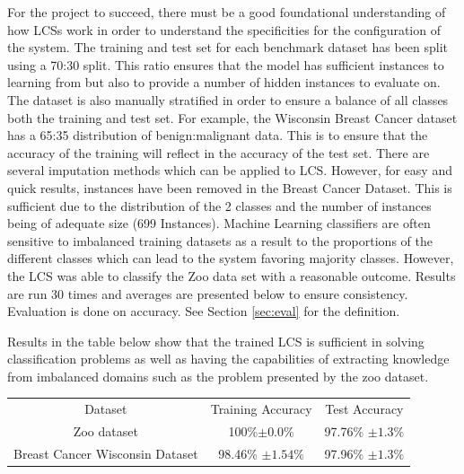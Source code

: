For the project to succeed, there must be a good foundational understanding of how LCSs work in order to understand the specificities for the configuration of the system. The training and test set for each benchmark dataset has been split using a 70:30 split. This ratio ensures that the model has sufficient instances to learning from but also to provide a number of hidden instances to evaluate on. The dataset is also manually stratified in order to ensure a balance of all classes both the training and test set. For example, the Wisconsin Breast Cancer dataset has a 65:35 distribution of benign:malignant data. This is to ensure that the accuracy of the training will reflect in the accuracy of the test set. There are several imputation methods which can be applied to LCS. However, for easy and quick results, instances have been removed in the Breast Cancer Dataset. This is sufficient due to the distribution of the 2 classes and the number of instances being of adequate size (699 Instances).  Machine Learning classifiers are often sensitive to imbalanced training datasets as a result to the proportions of the different classes which can lead to the system favoring majority classes. However, the LCS was able to classify the Zoo data set with a reasonable outcome. Results are run 30 times and averages are presented below to ensure consistency. Evaluation is done on accuracy. See Section \ref{sec:eval} for the definition.

Results in the table below show that the trained LCS is sufficient in solving classification problems as well as having the capabilities of extracting knowledge from imbalanced domains such as the problem presented by the zoo dataset.

\begin{center}
	\begin{tabular}{ |c|c|c| } 
		\hline
		Dataset & Training Accuracy & Test Accuracy \\ 
		Zoo dataset & 100\%$\pm0.0\% $ & 97.76\% $\pm1.3\% $ \\ 
		Breast Cancer Wisconsin Dataset & 98.46\% $ \pm1.54\% $& 97.96\% $ \pm1.3\% $\\ 
		\hline
	\end{tabular}
\end{center}

